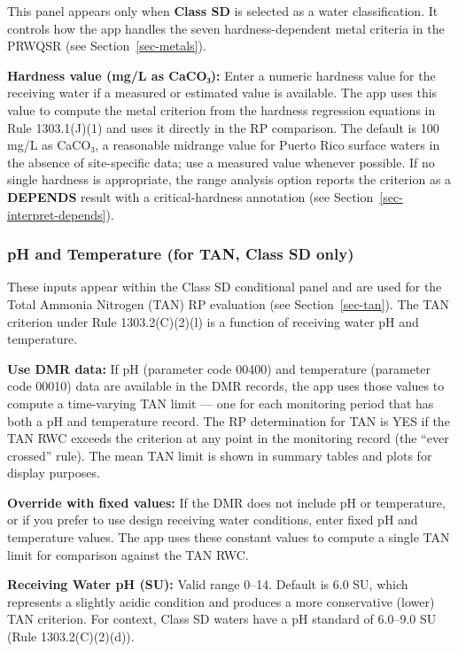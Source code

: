 \documentclass[
  11pt,
  letterpaper,
  DIV=11,
  numbers=noendperiod]{scrartcl}
\begin{document}
This panel appears only when \textbf{Class SD} is selected as a water
classification. It controls how the app handles the seven
hardness-dependent metal criteria in the PRWQSR (see
Section~\ref{sec-metals}).

\textbf{Hardness value (mg/L as CaCO₃):} Enter a numeric hardness value
for the receiving water if a measured or estimated value is available.
The app uses this value to compute the metal criterion from the hardness
regression equations in Rule 1303.1(J)(1) and uses it directly in the RP
comparison. The default is 100 mg/L as CaCO₃, a reasonable midrange
value for Puerto Rico surface waters in the absence of site-specific
data; use a measured value whenever possible. If no single hardness is
appropriate, the range analysis option reports the criterion as a
\textbf{DEPENDS} result with a critical-hardness annotation (see
Section~\ref{sec-interpret-depends}).

\subsubsection{pH and Temperature (for TAN, Class SD
only)}\label{sec-ph-temp-settings}

These inputs appear within the Class SD conditional panel and are used
for the Total Ammonia Nitrogen (TAN) RP evaluation (see
Section~\ref{sec-tan}). The TAN criterion under Rule 1303.2(C)(2)(l) is
a function of receiving water pH and temperature.

\textbf{Use DMR data:} If pH (parameter code 00400) and temperature
(parameter code 00010) data are available in the DMR records, the app
uses those values to compute a time-varying TAN limit --- one for each
monitoring period that has both a pH and temperature record. The RP
determination for TAN is YES if the TAN RWC exceeds the criterion at any
point in the monitoring record (the ``ever crossed'' rule). The mean TAN
limit is shown in summary tables and plots for display purposes.

\textbf{Override with fixed values:} If the DMR does not include pH or
temperature, or if you prefer to use design receiving water conditions,
enter fixed pH and temperature values. The app uses these constant
values to compute a single TAN limit for comparison against the TAN RWC.

\textbf{Receiving Water pH (SU):} Valid range 0--14. Default is 6.0 SU,
which represents a slightly acidic condition and produces a more
conservative (lower) TAN criterion. For context, Class SD waters have a
pH standard of 6.0--9.0 SU (Rule 1303.2(C)(2)(d)).
\end{document}
